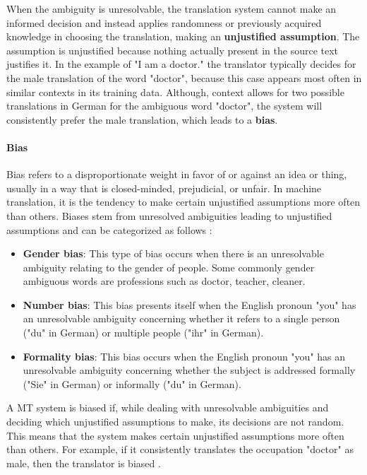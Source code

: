When the ambiguity is unresolvable, the translation system cannot make an informed decision and instead applies randomness or previously acquired knowledge in choosing the translation, making an \textbf{unjustified assumption}. The assumption is unjustified because nothing actually present in the source text justifies it. In the example of "I am a doctor." the translator typically decides for the male translation of the word "doctor", because this case appears most often in similar contexts in its training data. Although, context allows for two possible translations in German for the ambiguous word "doctor", the system will consistently prefer the male translation, which leads to a \textbf{bias}. 

\paragraph{Bias}
Bias refers to a disproportionate weight in favor of or against an idea or thing, usually in a way that is closed-minded, prejudicial, or unfair. In machine translation, it is the tendency to make certain unjustified assumptions more often than others. Biases stem from unresolved ambiguities leading to unjustified assumptions and can be categorized as follows \parencite{bias_taxonomy}:
\begin{itemize}
    \item \textbf{Gender bias}: This type of bias occurs when there is an unresolvable ambiguity relating to the gender of people. Some commonly gender ambiguous words are professions such as doctor, teacher, cleaner. 
    \item \textbf{Number bias}: This bias presents itself when the English pronoun "you" has an unresolvable ambiguity concerning whether it refers to a single person ("du" in German) or multiple people ("ihr" in German). 
    \item \textbf{Formality bias}: This bias occurs when the English pronoun "you" has an unresolvable ambiguity concerning whether the subject is addressed formally ("Sie" in German) or informally ("du" in German). 
\end{itemize}

A MT system is biased if, while dealing with unresolvable ambiguities and deciding which unjustified assumptions to make, its decisions are not random. This means that the system makes certain unjustified assumptions more often than others. For example, if it consistently translates the occupation "doctor" as male, then the translator is biased \parencite{bias_taxonomy}.


